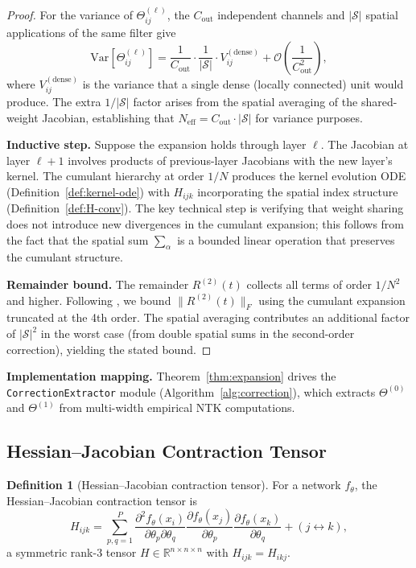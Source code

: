 \documentclass[11pt]{article}
\theoremstyle{definition}
\newtheorem{definition}[theorem]{Definition}
\newcommand{\R}{\mathbb{R}}
\newcommand{\Var}{\mathrm{Var}}
\newcommand{\cS}{\mathcal{S}}
\newcommand{\cO}{\mathcal{O}}
\newcommand{\norm}[1]{\lVert #1 \rVert}
\newcommand{\pp}{\partial}
\renewcommand{\Theta}{\varTheta}
\begin{document}
\begin{proof}
For the variance of $\Theta_{ij}^{(\ell)}$, the $C_{\mathrm{out}}$ independent channels and $|\cS|$ spatial applications of the same filter give
\begin{equation}
\Var[\Theta_{ij}^{(\ell)}] = \frac{1}{C_{\mathrm{out}}} \cdot \frac{1}{|\cS|} \cdot V^{(\mathrm{dense})}_{ij} + \cO\!\left(\frac{1}{C_{\mathrm{out}}^2}\right),
\end{equation}
where $V^{(\mathrm{dense})}_{ij}$ is the variance that a single dense (locally connected) unit would produce. The extra $1/|\cS|$ factor arises from the spatial averaging of the shared-weight Jacobian, establishing that $N_{\mathrm{eff}} = C_{\mathrm{out}} \cdot |\cS|$ for variance purposes.

\textbf{Inductive step.} Suppose the expansion holds through layer $\ell$. The Jacobian at layer $\ell+1$ involves products of previous-layer Jacobians with the new layer's kernel. The cumulant hierarchy at order $1/N$ produces the kernel evolution ODE (Definition~\ref{def:kernel-ode}) with $H_{ijk}$ incorporating the spatial index structure (Definition~\ref{def:H-conv}). The key technical step is verifying that weight sharing does not introduce new divergences in the cumulant expansion; this follows from the fact that the spatial sum $\sum_\alpha$ is a bounded linear operation that preserves the cumulant structure.

\textbf{Remainder bound.} The remainder $R^{(2)}(t)$ collects all terms of order $1/N^2$ and higher. Following \citet{huang2020dynamics}, we bound $\norm{R^{(2)}(t)}_F$ using the cumulant expansion truncated at the 4th order. The spatial averaging contributes an additional factor of $|\cS|^2$ in the worst case (from double spatial sums in the second-order correction), yielding the stated bound.
\end{proof}

\textbf{Implementation mapping.} Theorem~\ref{thm:expansion} drives the \texttt{CorrectionExtractor} module (Algorithm~\ref{alg:correction}), which extracts $\Theta^{(0)}$ and $\Theta^{(1)}$ from multi-width empirical NTK computations.

\subsection{Hessian--Jacobian Contraction Tensor}
\label{sec:H-tensor}

\begin{definition}[Hessian--Jacobian contraction tensor]
\label{def:H-general}
For a network $f_\theta$, the Hessian--Jacobian contraction tensor is
\begin{equation}
\label{eq:H-general}
H_{ijk} = \sum_{p,q=1}^P \frac{\pp^2 f_\theta(x_i)}{\pp\theta_p \pp\theta_q} \frac{\pp f_\theta(x_j)}{\pp\theta_p} \frac{\pp f_\theta(x_k)}{\pp\theta_q} + (j \leftrightarrow k),
\end{equation}
a symmetric rank-3 tensor $H \in \R^{n \times n \times n}$ with $H_{ijk} = H_{ikj}$.
\end{definition}
\end{document}
